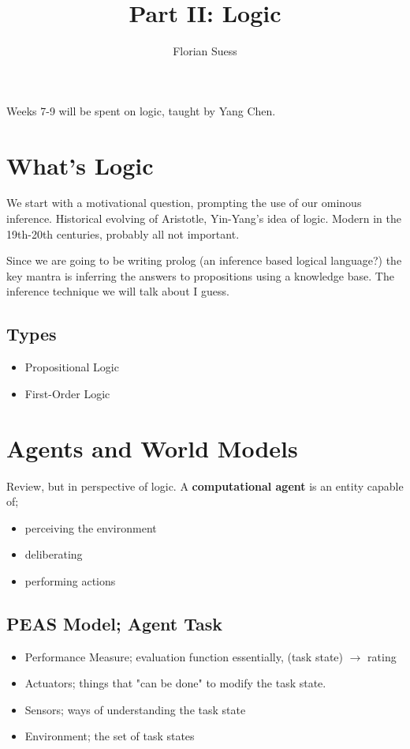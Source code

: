 \documentclass{article}
\begin{document}
\title{Part II: Logic}
\date{}
\author{Florian Suess}
\maketitle

Weeks 7-9 will be spent on logic, taught by Yang Chen.

\section{What's Logic}
We start with a motivational question, prompting the use of our ominous inference. Historical evolving of Aristotle, Yin-Yang's idea of logic. Modern in the 19th-20th centuries, probably all not important.

Since we are going to be writing prolog (an inference based logical language?) the key mantra is inferring the answers to propositions using a knowledge base. The inference technique we will talk about I guess.

\subsection{Types}
\begin{itemize}
	\item Propositional Logic
	\item First-Order Logic
\end{itemize}

\section{Agents and World Models}
Review, but in perspective of logic. A \textbf{computational agent} is an entity capable of;

\begin{itemize}
	\item perceiving the environment
	\item deliberating
	\item performing actions
\end{itemize}

\subsection{PEAS Model; Agent Task}
\begin{itemize}
	\item Performance Measure; evaluation function essentially, (task state) $\rightarrow$ rating
	\item Actuators; things that "can be done" to modify the task state.
	\item Sensors; ways of understanding the task state
	\item Environment; the set of task states
\end{itemize}
\end{document}

